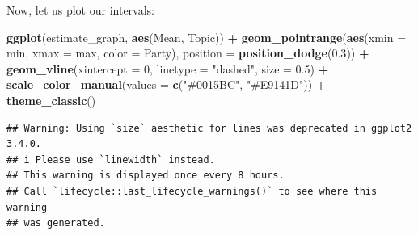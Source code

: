 \documentclass[
]{book}
\newenvironment{Shaded}{\begin{snugshade}}{\end{snugshade}}
\newcommand{\AttributeTok}[1]{\textcolor[rgb]{0.13,0.29,0.53}{#1}}
\newcommand{\DecValTok}[1]{\textcolor[rgb]{0.00,0.00,0.81}{#1}}
\newcommand{\FloatTok}[1]{\textcolor[rgb]{0.00,0.00,0.81}{#1}}
\newcommand{\FunctionTok}[1]{\textcolor[rgb]{0.13,0.29,0.53}{\textbf{#1}}}
\newcommand{\NormalTok}[1]{#1}
\newcommand{\OtherTok}[1]{\textcolor[rgb]{0.56,0.35,0.01}{#1}}
\newcommand{\SpecialCharTok}[1]{\textcolor[rgb]{0.81,0.36,0.00}{\textbf{#1}}}
\newcommand{\StringTok}[1]{\textcolor[rgb]{0.31,0.60,0.02}{#1}}
\begin{document}
\begin{Shaded}
\end{Shaded}

Now, let us plot our intervals:

\begin{Shaded}
\begin{Highlighting}[]
\FunctionTok{ggplot}\NormalTok{(estimate\_graph, }\FunctionTok{aes}\NormalTok{(Mean, Topic)) }\SpecialCharTok{+} \FunctionTok{geom\_pointrange}\NormalTok{(}\FunctionTok{aes}\NormalTok{(}\AttributeTok{xmin =}\NormalTok{ min, }\AttributeTok{xmax =}\NormalTok{ max,}
    \AttributeTok{color =}\NormalTok{ Party), }\AttributeTok{position =} \FunctionTok{position\_dodge}\NormalTok{(}\FloatTok{0.3}\NormalTok{)) }\SpecialCharTok{+} \FunctionTok{geom\_vline}\NormalTok{(}\AttributeTok{xintercept =} \DecValTok{0}\NormalTok{,}
    \AttributeTok{linetype =} \StringTok{"dashed"}\NormalTok{, }\AttributeTok{size =} \FloatTok{0.5}\NormalTok{) }\SpecialCharTok{+} \FunctionTok{scale\_color\_manual}\NormalTok{(}\AttributeTok{values =} \FunctionTok{c}\NormalTok{(}\StringTok{"\#0015BC"}\NormalTok{, }\StringTok{"\#E9141D"}\NormalTok{)) }\SpecialCharTok{+}
    \FunctionTok{theme\_classic}\NormalTok{()}
\end{Highlighting}
\end{Shaded}

\begin{verbatim}
## Warning: Using `size` aesthetic for lines was deprecated in ggplot2 3.4.0.
## i Please use `linewidth` instead.
## This warning is displayed once every 8 hours.
## Call `lifecycle::last_lifecycle_warnings()` to see where this warning
## was generated.
\end{verbatim}
\end{document}
